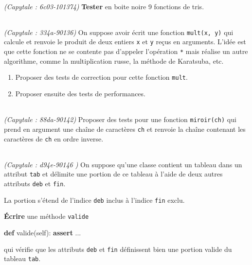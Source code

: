 \documentclass[a4paper,17pt]{extarticle}
\newenvironment{eleve}%
{\begin{activite}\color{noiramu}\\[-0.5cm]}
{\end{activite}}
\providecommand{\tightlist}{%
      \setlength{\itemsep}{0pt}\setlength{\parskip}{0pt}}
\newenvironment{Shaded}{}{}
\newcommand{\KeywordTok}[1]{\textcolor[rgb]{0.00,0.44,0.13}{\textbf{{#1}}}}
\newcommand{\NormalTok}[1]{{#1}}
\newcommand{\VariableTok}[1]{\textcolor[rgb]{0.10,0.09,0.49}{{#1}}}
\newcommand{\ControlFlowTok}[1]{\textcolor[rgb]{0.00,0.44,0.13}{\textbf{{#1}}}}
\begin{document}
\begin{eleve}
    \emph{(Capytale : 6c03-101374)} \textbf{Tester} en boite noire 9
fonctions de tris.
        
        \end{eleve}\begin{eleve}
    \emph{(Capytale : 334a-90136)} On suppose avoir écrit une fonction
\texttt{mult(x,\ y)} qui calcule et renvoie le produit de deux entiers
\texttt{x} et \texttt{y} reçus en arguments. L'idée est que cette
fonction ne se contente pas d'appeler l'opération \texttt{*} mais
réalise un autre algorithme, comme la multiplication russe, la méthode
de Karatsuba, etc.

\begin{enumerate}
\def\labelenumi{\arabic{enumi}.}
\tightlist
\item
  Proposer des tests de correction pour cette fonction \texttt{mult}.
\item
  Proposer ensuite des tests de performances.
\end{enumerate}
        
        \end{eleve}\begin{eleve}
    \emph{(Capytale : 88da-90142)} Proposer des tests pour une fonction
\texttt{miroir(ch)} qui prend en argument une chaîne de caractères
\texttt{ch} et renvoie la chaîne contenant les caractères de \texttt{ch}
en ordre inverse.
        
        \end{eleve}\begin{eleve}
    \emph{(Capytale : d94e-90146 )} On suppose qu'une classe contient un
tableau dans un attribut \texttt{tab} et délimite une portion de ce
tableau à l'aide de deux autres attributs \texttt{deb} et \texttt{fin}.

La portion s'étend de l'indice \texttt{deb} inclus à l'indice
\texttt{fin} exclu.

\textbf{Écrire} une méthode \texttt{valide}

\begin{Shaded}
\begin{Highlighting}[]
\KeywordTok{def}\NormalTok{ valide(}\VariableTok{self}\NormalTok{):}
    \ControlFlowTok{assert}\NormalTok{ ...}
\end{Highlighting}
\end{Shaded}

qui vérifie que les attributs \texttt{deb} et \texttt{fin} définissent
bien une portion valide du tableau \texttt{tab}.
        

\end{eleve}
\end{document}
